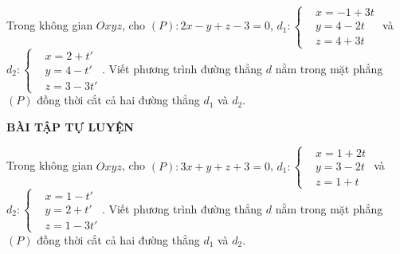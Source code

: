 \begin{vd}%
	Trong không gian $Oxyz$, cho $(P):2x-y+z-3=0$, $d_1:\left\{\begin{aligned}&x=-1+3t\\&y=4-2t\\&z=4+3t\end{aligned}\right.$ và $d_2:\left\{\begin{aligned}&x=2+t'\\&y=4-t'\\&z=3-3t'\end{aligned}\right.$. Viết phương trình đường thẳng $d$ nằm trong mặt phẳng $(P)$ đồng thời cắt cả hai đường thẳng $d_1$ và $d_2$.
\end{vd}
\begin{center}
	\textbf{BÀI TẬP TỰ LUYỆN}
\end{center}
\setcounter{bt}{0}
\begin{bt}%
	Trong không gian $Oxyz$, cho $(P):3x+y+z+3=0$, $d_1:\left\{\begin{aligned}&x=1+2t\\&y=3-2t\\&z=1+t\end{aligned}\right.$ và $d_2:\left\{\begin{aligned}&x=1-t'\\&y=2+t'\\&z=1-3t'\end{aligned}\right.$. Viết phương trình đường thẳng $d$ nằm trong mặt phẳng $(P)$ đồng thời cắt cả hai đường thẳng $d_1$ và $d_2$.
\end{bt}
